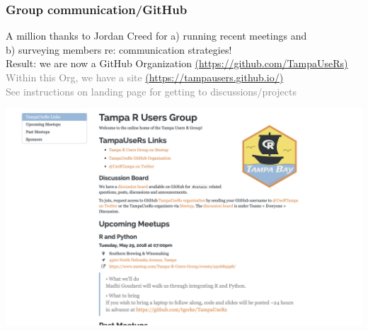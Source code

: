\documentclass{beamer}
\newcommand{\si}[1]{\hspace{.5cm} \textcolor{gray} {#1}\\}
\begin{document}
{\begin{frame}[t]
\frametitle{Group communication/GitHub}
A million thanks to Jordan Creed for a) running recent meetings and \\
\hspace{.5cm} b) surveying members re: communication strategies!\\
\vspace{.2cm}
Result: we are now a GitHub Organization {\tiny\href{https://github.com/TampaUseRs}{(https://github.com/TampaUseRs)}}\\
\si{Within this Org, we have a site {\tiny\href{https://tampausers.github.io/}{(https://tampausers.github.io/)}}}
\si{See instructions on landing page for getting to discussions/projects}
\begin{center}
\includegraphics[scale=.25, trim=0 0 0 0]{figures/webshot.png}
\end{center}
\end{frame}

}
\end{document}
